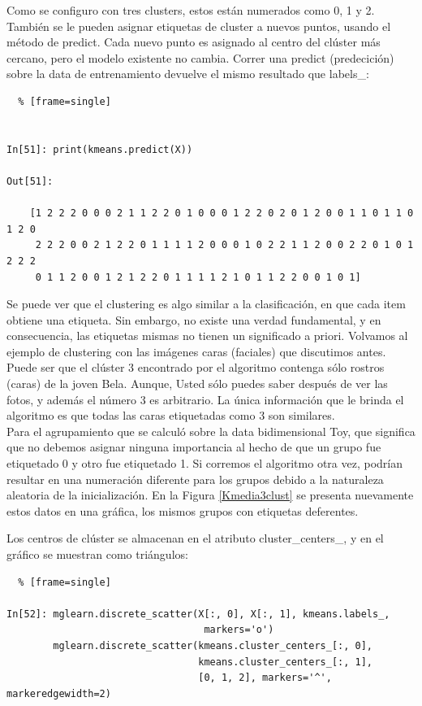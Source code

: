 Como se configuro con tres clusters, estos  están numerados  como  0, 1  y  2. \\

También se le pueden asignar etiquetas de cluster a nuevos puntos, usando el método de {\ttfamily predict}. Cada nuevo punto es asignado al centro del clúster más cercano, pero el modelo existente no  cambia. Correr una {\ttfamily  predict} (predecición)   sobre la data de entrenamiento devuelve el mismo resultado que {\ttfamily labels\_}:


\begin{lstlisting}  % [frame=single]	


In[51]: print(kmeans.predict(X))

Out[51]:

    [1 2 2 2 0 0 0 2 1 1 2 2 0 1 0 0 0 1 2 2 0 2 0 1 2 0 0 1 1 0 1 1 0 1 2 0 
     2 2 2 0 0 2 1 2 2 0 1 1 1 1 2 0 0 0 1 0 2 2 1 1 2 0 0 2 2 0 1 0 1 2 2 2  
     0 1 1 2 0 0 1 2 1 2 2 0 1 1 1 1 2 1 0 1 1 2 2 0 0 1 0 1]

\end{lstlisting}  %

Se puede ver que el clustering es algo similar a la clasificación, en  que cada item  obtiene
una etiqueta. Sin embargo, no existe una verdad fundamental,  y  en consecuencia, las etiquetas mismas
no tienen un significado a priori.   Volvamos al ejemplo de  clustering   con  las imágenes caras (faciales) que discutimos antes. Puede ser que el clúster 3 encontrado por el algoritmo contenga
sólo rostros (caras)  de la joven Bela. Aunque,  Usted sólo puedes saber  después de ver las fotos,   y además  el número 3 es arbitrario.  La única información que le brinda el algoritmo es que todas las caras etiquetadas como 3 son similares.\\


Para el agrupamiento que se calculó sobre la data bidimensional Toy, que significa que no debemos asignar ninguna importancia al hecho de que un grupo fue etiquetado 0 y otro fue etiquetado 1. Si corremos el algoritmo otra vez, podrían resultar en una numeración diferente para los grupos debido a la naturaleza aleatoria de la inicialización. En la  Figura \ref{Kmedia3clust} se presenta nuevamente estos datos en una  gráfica, los mismos grupos con etiquetas deferentes.


Los centros de clúster se almacenan en el atributo {\ttfamily cluster\_centers\_}, y en el  gráfico se muestran como triángulos:


\begin{lstlisting}  % [frame=single]	

In[52]: mglearn.discrete_scatter(X[:, 0], X[:, 1], kmeans.labels_,
                                  markers='o')
        mglearn.discrete_scatter(kmeans.cluster_centers_[:, 0],
                                 kmeans.cluster_centers_[:, 1], 
                                 [0, 1, 2], markers='^', markeredgewidth=2)


\end{lstlisting} 




